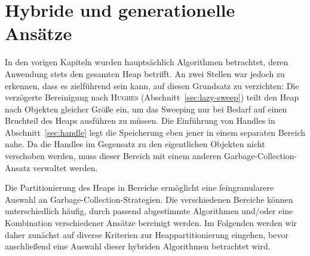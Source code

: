 \chapter{Hybride und generationelle Ansätze}
\label{cha:generational}

In den vorigen Kapiteln wurden hauptsächlich Algorithmen betrachtet, deren Anwendung stets den gesamten Heap betrifft.
An zwei Stellen war jedoch zu erkennen, dass es zielführend sein kann, auf diesen Grundsatz zu verzichten:
Die verzögerte Bereinigung nach \textsc{Hughes} (Abschnitt~\ref{sec:lazy-sweep}) teilt den Heap nach Objekten gleicher Größe ein, um das Sweeping nur bei Bedarf auf einen Bruchteil des Heaps ausführen zu müssen.
Die Einführung von Handles in Abschnitt~\ref{sec:handle} legt die Speicherung eben jener in einem separaten Bereich nahe.
Da die Handles im Gegensatz zu den eigentlichen Objekten nicht verschoben werden, muss dieser Bereich mit einem anderen Garbage-Collection-Ansatz verwaltet werden.

Die Partitionierung des Heaps in Bereiche ermöglicht eine feingranularere Auswahl an Garbage-Collection-Strategien.
Die verschiedenen Bereiche können unterschiedlich häufig, durch passend abgestimmte Algorithmen und/oder eine Kombination verschiedener Ansätze bereinigt werden.
Im Folgenden werden wir daher zunächst auf diverse Kriterien zur Heappartitionierung eingehen, bevor anschließend eine Auswahl dieser hybriden Algorithmen betrachtet wird.




